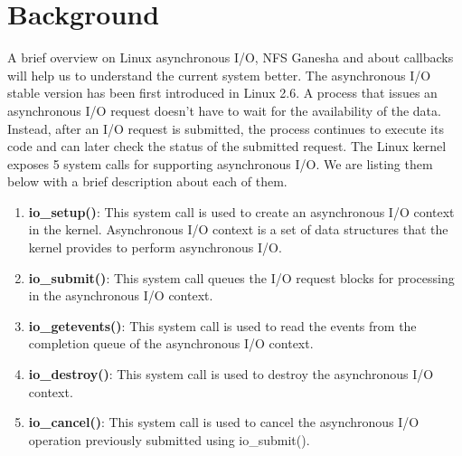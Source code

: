 \section{Background}
\label{bg}

A brief overview on Linux asynchronous I/O, NFS Ganesha and about callbacks will help us to understand the current system better. The asynchronous I/O stable version has been first introduced in Linux 2.6. A process that issues an asynchronous I/O request doesn't have to wait for the availability of the data. Instead, after an I/O request is submitted, the process continues to execute its code and can later check the status of the submitted request. The Linux kernel exposes 5 system calls \cite{kernelCode} for supporting asynchronous I/O. We are listing them below with a brief description about each of them.

\begin{enumerate}

\item{\textbf{io\_setup()}: This system call is used to create an asynchronous I/O context in the kernel. Asynchronous I/O context is a set of data structures that the kernel provides to perform asynchronous I/O.}

\item{\textbf{io\_submit()}: This system call queues the I/O request blocks for processing in the asynchronous I/O context.}

\item{\textbf{io\_getevents()}: This system call is used to read the events from the completion queue of the asynchronous I/O context.}

\item{\textbf{io\_destroy()}: This system call is used to destroy the asynchronous I/O context.}

\item{\textbf{io\_cancel()}: This system call is used to cancel the asynchronous I/O operation previously submitted using io\_submit().}

\end{enumerate}

